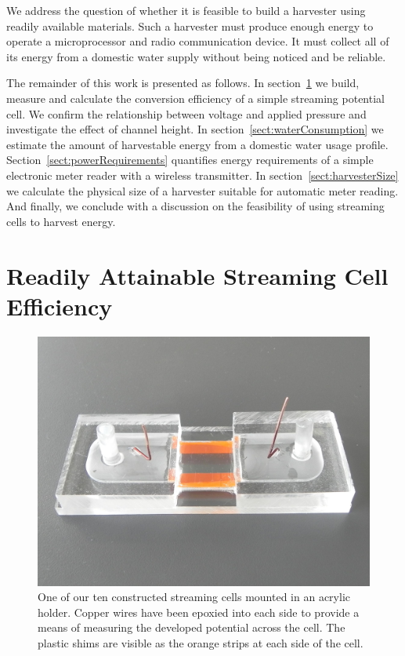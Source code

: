 \documentclass[10pt,final,journal]{IEEEtran}
\begin{document}
    We address the question of whether it is feasible to build a harvester using readily available materials.
    Such a harvester must produce enough energy to operate a microprocessor and radio communication device.
    It must collect all of its energy from a domestic water supply without being noticed and be reliable.

    The remainder of this work is presented as follows.
    In section~\ref{sect:streamingCell} we build, measure and calculate the conversion efficiency of a simple streaming potential cell.
    We confirm the relationship between voltage and applied pressure and investigate the effect of channel height.
    In section~\ref{sect:waterConsumption} we estimate the amount of harvestable energy from a domestic water usage profile.
    Section~\ref{sect:powerRequirements} quantifies energy requirements of a simple electronic meter reader with a wireless transmitter.
    In section~\ref{sect:harvesterSize} we calculate the physical size of a harvester suitable for automatic meter reading.
    And finally, we conclude with a discussion on the feasibility of using streaming cells to harvest energy.

    \section{Readily Attainable Streaming Cell Efficiency} \label{sect:streamingCell}
    \begin{figure}
        \begin{center}
        \includegraphics[width=\linewidth]{Photo_streamingPotential_Assembly_Step3.JPG}
        \end{center}
        \caption{One of our ten constructed streaming cells mounted in an acrylic holder. Copper wires have been epoxied into each side to provide a means of measuring the developed potential across the cell. The plastic shims are visible as the orange strips at each side of the cell.}
        \label{fig:cell}
    \end{figure}
\end{document}
